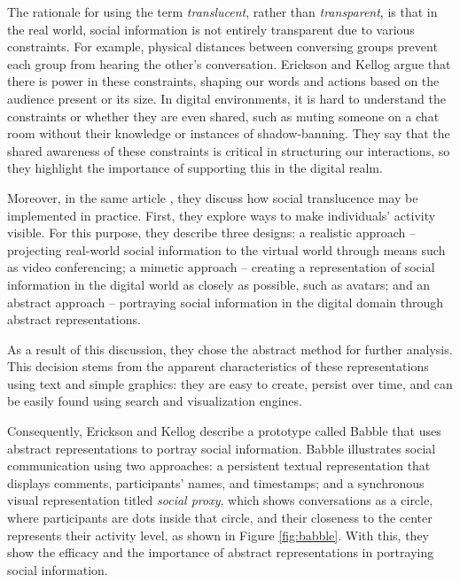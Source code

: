     The rationale for using the term \textit{translucent}, rather than \textit{transparent}, is that in the real world, social information is not entirely transparent due to various constraints. For example, physical distances between conversing groups prevent each group from hearing the other's conversation. Erickson and Kellog argue that there is power in these constraints, shaping our words and actions based on the audience present or its size. In digital environments, it is hard to understand the constraints or whether they are even shared, such as muting someone on a chat room without their knowledge or instances of shadow-banning. They say that the shared awareness of these constraints is critical in structuring our interactions, so they highlight the importance of supporting this in the digital realm. 

    Moreover, in the same article \cite{ericksonSocialTranslucenceApproach2000}, they discuss how social translucence may be implemented in practice. First, they explore ways to make individuals' activity visible. For this purpose, they describe three designs: a realistic approach -- projecting real-world social information to the virtual world through means such as video conferencing; a mimetic approach -- creating a representation of social information in the digital world as closely as possible, such as avatars; and an abstract approach -- portraying social information in the digital domain through abstract representations.

    As a result of this discussion, they \cite{ericksonSocialTranslucenceApproach2000} chose the abstract method for further analysis. This decision stems from the apparent characteristics of these representations using text and simple graphics: they are easy to create, persist over time, and can be easily found using search and visualization engines.

    Consequently, Erickson and Kellog describe a prototype called Babble that uses abstract representations to portray social information. Babble illustrates social communication using two approaches: a persistent textual representation that displays comments, participants' names, and timestamps; and a synchronous visual representation titled \textit{social proxy}, which shows conversations as a circle, where participants are dots inside that circle, and their closeness to the center represents their activity level, as shown in Figure \ref{fig:babble}. With this, they show the efficacy and the importance of abstract representations in portraying social information.

